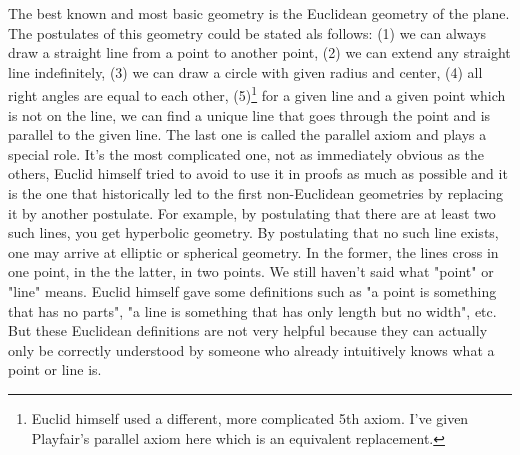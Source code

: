 \medskip
The best known and most basic geometry is the Euclidean geometry of the plane. The postulates of this geometry could be stated als follows: (1) we can always draw a straight line from a point to another point, (2) we can extend any straight line indefinitely, (3) we can draw a circle with given radius and center, (4) all right angles are equal to each other, (5)\footnote{Euclid himself used a different, more complicated 5th axiom. I've given Playfair's parallel axiom here which is an equivalent replacement.} for a given line and a given point which is not on the line, we can find a unique line that goes through the point and is parallel to the given line. The last one is called the parallel axiom and plays a special role. It's the most complicated one, not as immediately obvious as the others, Euclid himself tried to avoid to use it in proofs as much as possible and it is the one that historically led to the first non-Euclidean geometries by replacing it by another postulate. For example, by postulating that there are at least two such lines, you get hyperbolic geometry. By postulating that no such line exists, one may arrive at elliptic or spherical geometry. In the former, the lines cross in one point, in the the latter, in two points. We still haven't said what "point" or "line" means. Euclid himself gave some definitions such as "a point is something that has no parts", "a line is something that has only length but no width", etc. But these Euclidean definitions are not very helpful because they can actually only be correctly understood by someone who already intuitively knows what a point or line is.

